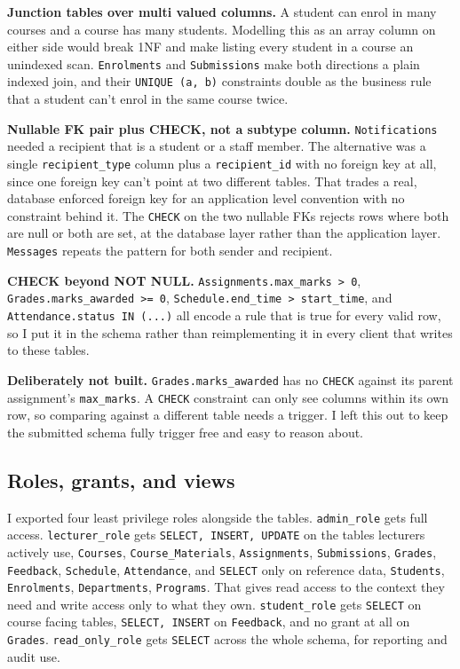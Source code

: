 \documentclass[12pt,a4paper]{article}
\begin{document}
\noindent\textbf{Junction tables over multi valued columns.} A student can enrol in many courses and a course has many students. Modelling this as an array column on either side would break 1NF and make listing every student in a course an unindexed scan. \lstinline|Enrolments| and \lstinline|Submissions| make both directions a plain indexed join, and their \lstinline|UNIQUE (a, b)| constraints double as the business rule that a student can't enrol in the same course twice.

\noindent\textbf{Nullable FK pair plus CHECK, not a subtype column.} \lstinline|Notifications| needed a recipient that is a student or a staff member. The alternative was a single \lstinline|recipient_type| column plus a \lstinline|recipient_id| with no foreign key at all, since one foreign key can't point at two different tables. That trades a real, database enforced foreign key for an application level convention with no constraint behind it. The \lstinline|CHECK| on the two nullable FKs rejects rows where both are null or both are set, at the database layer rather than the application layer. \lstinline|Messages| repeats the pattern for both sender and recipient.

\noindent\textbf{CHECK beyond NOT NULL.} \lstinline|Assignments.max_marks > 0|, \lstinline|Grades.marks_awarded >= 0|, \lstinline|Schedule.end_time > start_time|, and \lstinline|Attendance.status IN (...)| all encode a rule that is true for every valid row, so I put it in the schema rather than reimplementing it in every client that writes to these tables.

\noindent\textbf{Deliberately not built.} \lstinline|Grades.marks_awarded| has no \lstinline|CHECK| against its parent assignment's \lstinline|max_marks|. A \lstinline|CHECK| constraint can only see columns within its own row, so comparing against a different table needs a trigger. I left this out to keep the submitted schema fully trigger free and easy to reason about.

\subsection{Roles, grants, and views}
\label{sec:roles}

I exported four least privilege roles alongside the tables. \lstinline|admin_role| gets full access. \lstinline|lecturer_role| gets \lstinline|SELECT, INSERT, UPDATE| on the tables lecturers actively use, \lstinline|Courses|, \lstinline|Course_Materials|, \lstinline|Assignments|, \lstinline|Submissions|, \lstinline|Grades|, \lstinline|Feedback|, \lstinline|Schedule|, \lstinline|Attendance|, and \lstinline|SELECT| only on reference data, \lstinline|Students|, \lstinline|Enrolments|, \lstinline|Departments|, \lstinline|Programs|. That gives read access to the context they need and write access only to what they own. \lstinline|student_role| gets \lstinline|SELECT| on course facing tables, \lstinline|SELECT, INSERT| on \lstinline|Feedback|, and no grant at all on \lstinline|Grades|. \lstinline|read_only_role| gets \lstinline|SELECT| across the whole schema, for reporting and audit use.
\end{document}

